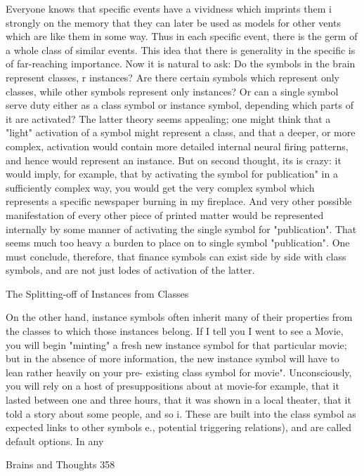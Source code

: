   Everyone knows that specific events have a vividness which imprints them i strongly on
the memory that they can later be used as models for other vents which are like them in
some way. Thus in each specific event, there is the germ of a whole class of similar
events. This idea that there is generality in the specific is of far-reaching importance.
  Now it is natural to ask: Do the symbols in the brain represent classes, r instances? Are
there certain symbols which represent only classes, while other symbols represent only
instances? Or can a single symbol serve duty either as a class symbol or instance symbol,
depending which parts of it are activated? The latter theory seems appealing; one might
think that a "light" activation of a symbol might represent a class, and that a deeper, or
more complex, activation would contain more detailed internal neural firing patterns, and
hence would represent an instance. But on second thought, its is crazy: it would imply,
for example, that by activating the symbol for publication" in a sufficiently complex way,
you would get the very complex symbol which represents a specific newspaper burning
in my fireplace. And very other possible manifestation of every other piece of printed
matter would be represented internally by some manner of activating the single symbol
for "publication". That seems much too heavy a burden to place on to single symbol
"publication". One must conclude, therefore, that finance symbols can exist side by side
with class symbols, and are not just lodes of activation of the latter.

                       The Splitting-off of Instances from Classes

  On the other hand, instance symbols often inherit many of their properties from the
classes to which those instances belong. If I tell you I went to see a Movie, you will begin
"minting" a fresh new instance symbol for that particular movie; but in the absence of
more information, the new instance symbol will have to lean rather heavily on your pre-
existing class symbol for movie". Unconsciously, you will rely on a host of
presuppositions about at movie-for example, that it lasted between one and three hours,
that it was shown in a local theater, that it told a story about some people, and so i. These
are built into the class symbol as expected links to other symbols e., potential triggering
relations), and are called default options. In any




Brains and Thoughts                                                                      358

